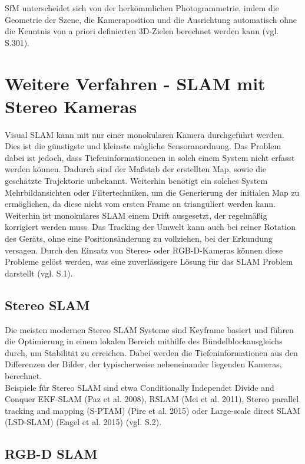 SfM unterscheidet sich von der herkömmlichen Photogrammetrie, indem die Geometrie der Szene, die Kameraposition und die Ausrichtung automatisch ohne die Kenntnis von a priori definierten 3D-Zielen berechnet werden kann (vgl. \cite{sfm_photo} S.301).

\section{Weitere Verfahren - SLAM mit Stereo Kameras}

Visual SLAM kann mit nur einer monokularen Kamera durchgeführt werden. Dies ist die günstigste und kleinste mögliche Sensoranordnung. Das Problem dabei ist jedoch, dass Tiefeninformationenen in solch einem System nicht erfasst werden können. Dadurch sind der Maßstab der erstellten Map, sowie die geschätzte Trajektorie unbekannt. Weiterhin benötigt ein solches System Mehrbildansichten oder Filtertechniken, um die Generierung der initialen Map zu ermöglichen, da diese nicht vom ersten Frame an trianguliert werden kann. Weiterhin ist monokulares SLAM einem Drift ausgesetzt, der regelmäßig korrigiert werden muss. Das Tracking der Umwelt kann auch bei reiner Rotation des Geräts, ohne eine Positionsänderung zu vollziehen, bei der Erkundung versagen. Durch den Einsatz von Stereo- oder RGB-D-Kameras können diese Probleme gelöst werden, was eine zuverlässigere Lösung für das SLAM Problem darstellt (vgl. \cite{orbslam2} S.1).

\subsection{Stereo SLAM}

Die meisten modernen Stereo SLAM Systeme sind Keyframe basiert und führen die Optimierung in einem lokalen Bereich mithilfe des Bündelblockausgleichs durch, um Stabilität zu erreichen. Dabei werden die Tiefeninformationen aus den Differenzen der Bilder, der typischerweise nebeneinander liegenden Kameras, berechnet. \\ Beispiele für Stereo SLAM sind etwa \glqq Conditionally Independet Divide and Conquer EKF-SLAM\grqq{} (Paz et al. 2008), \glqq RSLAM\grqq{} (Mei et al. 2011), \glqq Stereo parallel tracking and mapping (S-PTAM)\grqq{} (Pire et al. 2015) oder \glqq Large-scale direct SLAM (LSD-SLAM)\grqq{} (Engel et al. 2015) (vgl. \cite{orbslam2} S.2).

\subsection{RGB-D SLAM}

